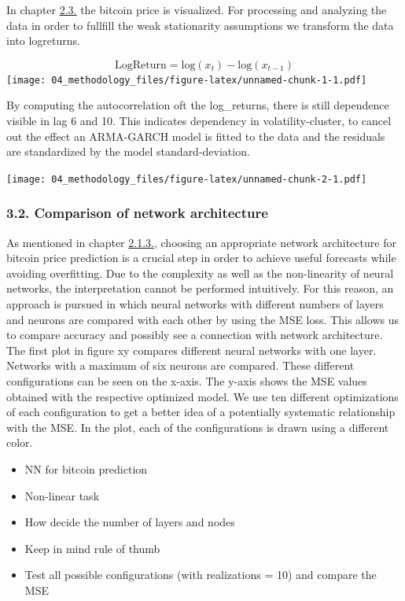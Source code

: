 \documentclass[
]{article}
\providecommand{\tightlist}{%
  \setlength{\itemsep}{0pt}\setlength{\parskip}{0pt}}
\begin{document}
In chapter \protect\hyperlink{bitcoin}{2.3.} the bitcoin price is
visualized. For processing and analyzing the data in order to fullfill
the weak stationarity assumptions we transform the data into logreturns.

\[\mathrm{LogReturn} = \mathrm{log}(x_{t})-\mathrm{log}(x_{t-1})\]
\texttt{[image: 04\_methodology\_files/figure-latex/unnamed-chunk-1-1.pdf]}

By computing the autocorrelation oft the log\_returns, there is still
dependence visible in lag 6 and 10. This indicates dependency in
volatility-cluster, to cancel out the effect an ARMA-GARCH model is
fitted to the data and the residuals are standardized by the model
standard-deviation.

\texttt{[image: 04\_methodology\_files/figure-latex/unnamed-chunk-2-1.pdf]}

\hypertarget{comparison-of-network-architecture}{%
\subsubsection{3.2. Comparison of network
architecture}\label{comparison-of-network-architecture}}

As mentioned in chapter \protect\hyperlink{MLP}{2.1.3.}, choosing an
appropriate network architecture for bitcoin price prediction is a
crucial step in order to achieve useful forecasts while avoiding
overfitting. Due to the complexity as well as the non-linearity of
neural networks, the interpretation cannot be performed intuitively. For
this reason, an approach is pursued in which neural networks with
different numbers of layers and neurons are compared with each other by
using the MSE loss. This allows us to compare accuracy and possibly see
a connection with network architecture. The first plot in figure xy
compares different neural networks with one layer. Networks with a
maximum of six neurons are compared. These different configurations can
be seen on the x-axis. The y-axis shows the MSE values obtained with the
respective optimized model. We use ten different optimizations of each
configuration to get a better idea of a potentially systematic
relationship with the MSE. In the plot, each of the configurations is
drawn using a different color.

\begin{itemize}
\tightlist
\item
  NN for bitcoin prediction
\item
  Non-linear task
\item
  How decide the number of layers and nodes
\item
  Keep in mind rule of thumb
\item
  Test all possible configurations (with realizations = 10) and compare
  the MSE
\end{itemize}
\end{document}
